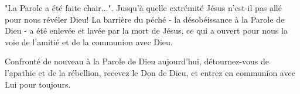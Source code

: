 "La Parole a été faite chair...". Jusqu'à quelle extrémité Jésus n'est-il pas allé pour nous révéler Dieu! La barrière du péché - la désobéissance à la Parole de Dieu - a été enlevée et lavée par la mort de Jésus, ce qui a ouvert pour nous la voie de l'amitié et de la communion avec Dieu.

Confronté de nouveau à la Parole de Dieu aujourd'hui, détournez-vous de l'apathie et de la rébellion, recevez le Don de Dieu, et entrez en communion avec Lui pour toujours.

\enlargethispage{5\baselineskip}



